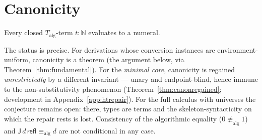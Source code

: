 \documentclass{lmcs}
\newcommand{\refl}{\mathsf{refl}}
\newcommand{\J}{\mathsf{J}}
\newcommand{\aconv}{\equiv_{\mathrm{alg}}}
\begin{document}
\section{Canonicity}
\label{sec:canonicity}

\begin{conj}[Canonicity]\label{thm:canonicity}
  Every closed $T_{\mathrm{alg}}$-term $t : \mathbb{N}$ evaluates to
  a numeral.
\end{conj}

\noindent The status is precise.  For derivations whose conversion
instances are environment-uniform, canonicity is a theorem (the
argument below, via Theorem~\ref{thm:fundamental}).  For the
\emph{minimal core}, canonicity is regained \emph{unrestrictedly} by
a different invariant --- unary and endpoint-blind, hence immune to
the non-substitutivity phenomenon
(Theorem~\ref{thm:canonregained}; development in
Appendix~\ref{app:htrepair}).  For the full calculus with universes
the conjecture remains open: there, types are terms and the
skeleton-syntacticity on which the repair rests is lost.
Consistency of the algorithmic equality ($0 \not\aconv 1$) and
$\J\,d\,\refl \aconv d$ are not conditional in any case.
\end{document}

